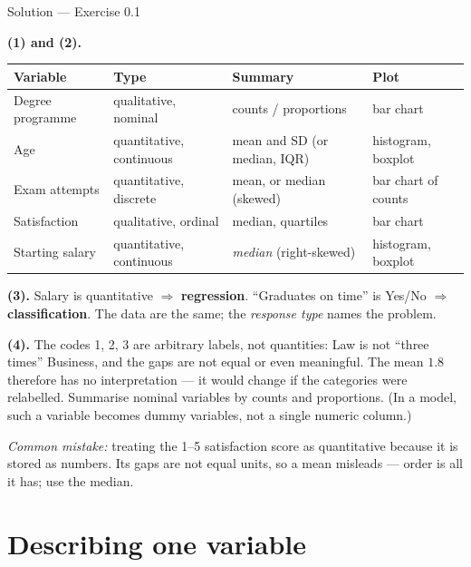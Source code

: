 \documentclass[aspectratio=169,11pt]{beamer}
\begin{document}
\begin{frame}{Solution --- Exercise 0.1}
  \begin{solutionbox}
    \scriptsize
    \textbf{(1) and (2).}
    \begin{center}\scriptsize
    \begin{tabular}{@{}llll@{}}
      \toprule
      \textbf{Variable} & \textbf{Type} & \textbf{Summary} & \textbf{Plot} \\
      \midrule
      Degree programme & qualitative, nominal & counts / proportions & bar chart \\
      Age & quantitative, continuous & mean and SD (or median, IQR) & histogram, boxplot \\
      Exam attempts & quantitative, discrete & mean, or median (skewed) & bar chart of counts \\
      Satisfaction & qualitative, ordinal & median, quartiles & bar chart \\
      Starting salary & quantitative, continuous & \emph{median} (right-skewed) & histogram, boxplot \\
      \bottomrule
    \end{tabular}
    \end{center}
    \textbf{(3).} Salary is quantitative $\Rightarrow$ \textbf{regression}.
    ``Graduates on time'' is Yes/No $\Rightarrow$ \textbf{classification}.
    The data are the same; the \emph{response type} names the problem.

    \textbf{(4).} The codes 1, 2, 3 are arbitrary labels, not quantities:
    Law is not ``three times'' Business, and the gaps are not equal or even
    meaningful. The mean $1.8$ therefore has no interpretation --- it would
    change if the categories were relabelled. Summarise nominal variables by
    counts and proportions. (In a model, such a variable becomes dummy
    variables, not a single numeric column.)

    \textit{Common mistake:} treating the 1--5 satisfaction score as
    quantitative because it is stored as numbers. Its gaps are not equal
    units, so a mean misleads --- order is all it has; use the median.
  \end{solutionbox}
\end{frame}


\section{Describing one variable}
\end{document}
